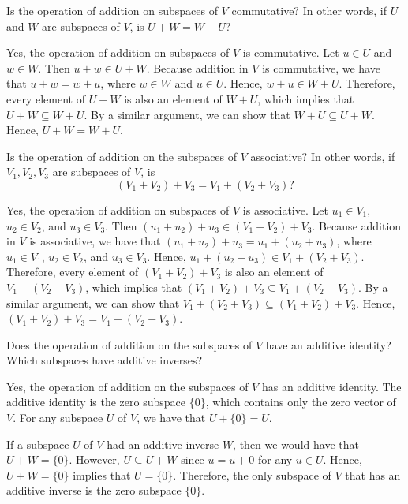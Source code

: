 \begin{exercise}[1c16]
    Is the operation of addition on subspaces of $V$ commutative? In other words, if $U$ and $W$ are subspaces of $V$, is $U + W = W + U$?
\end{exercise}

\begin{sol}
    Yes, the operation of addition on subspaces of $V$ is commutative. Let $u \in U$ and $w \in W$. Then $u + w \in U + W$. Because addition in $V$ is commutative, we have that $u + w = w + u$, where $w \in W$ and $u \in U$. Hence, $w + u \in W + U$. Therefore, every element of $U + W$ is also an element of $W + U$, which implies that $U + W \subseteq W + U$. By a similar argument, we can show that $W + U \subseteq U + W$. Hence, $U + W = W + U$.
\end{sol}

\begin{exercise}[1c17]
    Is the operation of addition on the subspaces of $V$ associative? In other words, if $V_1, V_2, V_3$ are subspaces of $V$, is
    \[(V_1 + V_2) + V_3 = V_1 + (V_2 + V_3)?\]
\end{exercise}

\begin{sol}
    Yes, the operation of addition on subspaces of $V$ is associative. Let $u_1 \in V_1$, $u_2 \in V_2$, and $u_3 \in V_3$. Then $(u_1 + u_2) + u_3 \in (V_1 + V_2) + V_3$. Because addition in $V$ is associative, we have that $(u_1 + u_2) + u_3 = u_1 + (u_2 + u_3)$, where $u_1 \in V_1$, $u_2 \in V_2$, and $u_3 \in V_3$. Hence, $u_1 + (u_2 + u_3) \in V_1 + (V_2 + V_3)$. Therefore, every element of $(V_1 + V_2) + V_3$ is also an element of $V_1 + (V_2 + V_3)$, which implies that $(V_1 + V_2) + V_3 \subseteq V_1 + (V_2 + V_3)$. By a similar argument, we can show that $V_1 + (V_2 + V_3) \subseteq (V_1 + V_2) + V_3$. Hence, $(V_1 + V_2) + V_3 = V_1 + (V_2 + V_3)$.
\end{sol}

\begin{exercise}[1c18]
    Does the operation of addition on the subspaces of $V$ have an additive identity? Which subspaces have additive inverses?
\end{exercise}

\begin{sol}
    Yes, the operation of addition on the subspaces of $V$ has an additive identity. The additive identity is the zero subspace $\{0\}$, which contains only the zero vector of $V$. For any subspace $U$ of $V$, we have that $U + \{0\} = U$.

    If a subspace $U$ of $V$ had an additive inverse $W$, then we would have that $U + W = \{0\}$. However, $U \subseteq U + W$ since $u = u + 0$ for any $u \in U$. Hence, $U + W = \{0\}$ implies that $U = \{0\}$. Therefore, the only subspace of $V$ that has an additive inverse is the zero subspace $\{0\}$.
\end{sol}

